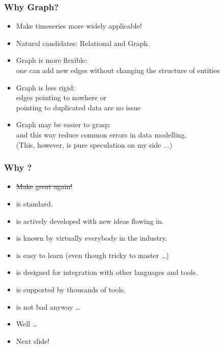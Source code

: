 \documentclass{beamer}
\begin{document}
\begin{frame}
\frametitle{Why Graph?}
\begin{itemize}
\item Make timeseries more widely applicable!
\item Natural candidates: Relational and Graph.
\item Graph is more flexible:\\
      one can add new edges without changing the structure of entities
\item Graph is less rigid:\\
      edges pointing to nowhere or\\
            pointing to duplicated data are no issue
\item Graph may be easier to grasp:\\
      and this way reduce common errors in data modelling.\\
      (This, however, is pure speculation on my side $\dots$)
\end{itemize}
\end{frame}

\begin{frame}
\frametitle{Why ?}
\begin{itemize}
\item \st{Make }\st{ great again!}
\item {} is standard.
\item {} is actively developed with new ideas flowing in.
\item {} is known by virtually everybody in the industry.
\item {} is easy to learn (even though tricky to master \dots)
\item {} is designed for integration with other languages and tools.
\item {} is supported by thousands of tools.
\item {} is not bad anyway \dots
\item Well \dots
\item Next slide!
\end{itemize}
\end{frame}
\end{document}
